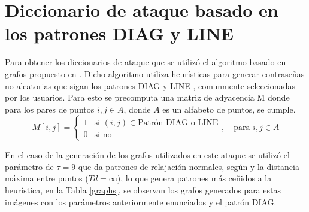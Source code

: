 \section{Diccionario de ataque basado en los patrones DIAG y LINE}
Para obtener los diccionarios de ataque que se utiliz\'o el algoritmo basado en grafos propuesto en \cite{van2010purely}. Dicho algoritmo utiliza heur\'isticas para generar contrase\~nas no aleatorias que sigan los patrones DIAG y LINE \cite{s22051987},  comunmente seleccionadas por los usuarios. Para esto se precomputa una matriz de adyacencia M donde para los pares de puntos $i,j \in A$, donde $A$ es un alfabeto de puntos, se cumple.
\[
 M[i,j] = 
\begin{cases} 
	1 & \text{si } (i, j) \in \text{Patrón DIAG o LINE} \\
	0 & \text{si no}
\end{cases}
, \quad \text{para } i,j \in A
\] 

En el caso de la generaci\'on de los grafos utilizados en este ataque se utiliz\'o el par\'ametro de $\tau=9$ que da patrones de relajaci\'on normales, seg\'un \cite{van2010purely} y la distancia m\'axima entre puntos ($Td = \infty$), lo que genera patrones m\'as ce\~nidos a la heur\'istica, en la Tabla \ref{graphs},  se observan los grafos generados para estas im\'agenes con los par\'ametros anteriormente enunciados y el patr\'on DIAG.



